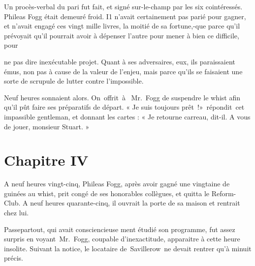 \documentclass[]{book}
\begin{document}
               Un procès-verbal du pari fut fait, et signé sur-le-champ par les six cointéressés.
               Phileas Fogg était demeuré froid. I1 n'avait certainement pas parié pour gagner,
               et n'avait engagé ces vingt mille livres, la moitié de sa fortune,-que parce qu'il 
               prévoyait qu'il pourrait avoir à dépenser
               l'autre pour mener à bien ce difficile, pour 
               
               ne pas dire inexécutable projet. Quant à
               ses adversaires, eux, ils paraissaient
               émus, non pas à cause de la valeur de
               l'enjeu, mais parce qu'ils se faisaient une
               sorte de scrupule de lutter contre l'impossible.
            
               Neuf heures sonnaient alors. On offrit à
                Mr. Fogg de suspendre le whist afin qu'il
               pût faire ses préparatifs de départ.
               « Je suis toujours prêt !» répondit cet 
               impassible gentleman, et donnant les cartes :\newline
               « Je retourne carreau, dit-il. A vous de
               jouer, monsieur Stuart. »\newline
            
            \chapter{Chapitre IV}
            
            
               A neuf heures vingt-cinq, Phileas Fogg,
               après avoir gagné une vingtaine de guinées au whist, prit congé de ses honorables collègues, et quitta le Reform-Club.
               A neuf heures quarante-cinq, il ouvrait la
               porte de sa maison et rentrait chez lui.
            
               Passepartout, qui avait consciencieuse
               ment étudié son programme, fut assez surpris en voyant Mr. Fogg, coupable d'inexactitude, apparaitre à cette heure insolite.
               Suivant la notice, le locataire de Savillerow ne devait rentrer qu'à minuit précis.
            
\end{document}
